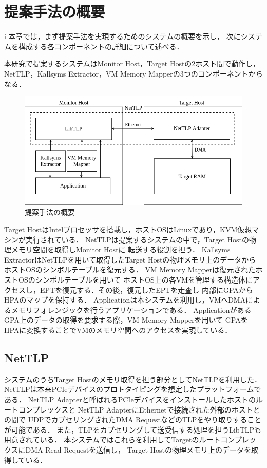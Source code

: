\chapter{提案手法の概要}
\label{chap:system_overview}

i
本章では，まず提案手法を実現するためのシステムの概要を示し，
次にシステムを構成する各コンポーネントの詳細について述べる．

本研究で提案するシステムはMonitor Host，Target Hostの2ホスト間で動作し，
NetTLP\cite{nettlp}，Kallsyms Extractor，VM Memory Mapperの3つのコンポーネントからなる．

\begin{figure}[h]
  \includegraphics[scale=0.305]{system_overview.png}
  \caption{提案手法の概要}
  \label{fig:sysytem_overview}
\end{figure}

Target HostはIntelプロセッサを搭載し，ホストOSはLinuxであり，KVM仮想マシンが実行されている．
NetTLPは提案するシステムの中で，Target Hostの物理メモリ空間を取得しMonitor Hostに
転送する役割を担う．
Kallsyms ExtractorはNetTLPを用いて取得したTarget Hostの物理メモリ上のデータから
ホストOSのシンボルテーブルを復元する．
VM Memory Mapperは復元されたホストOSのシンボルテーブルを用いて
ホストOS上の各VMを管理する構造体にアクセスし，EPTを復元する．その後，復元したEPTを走査し
内部にGPAからHPAのマップを保持する．
Applicationは本システムを利用し，VMへDMAによるメモリフォレンジックを行うアプリケーションである．
ApplicationがあるGPA上のデータの取得を要求する際，VM Memory Mapperを用いて
GPAをHPAに変換することでVMのメモリ空間へのアクセスを実現している．


\section{NetTLP}

システムのうちTarget Hostのメモリ取得を担う部分としてNetTLP\cite{nettlp}を利用した．
NetTLPは本来PCIeデバイスのプロトタイピングを想定したプラットフォームである．
NetTLP Adapterと呼ばれるPCIeデバイスをインストールしたホストのルートコンプレックスと
NetTLP AdapterにEthernetで接続された外部のホストとの間で
UDPでカプセリングされたDMA RequestなどのTLPをやり取りすることが可能である．
また，TLPをカプセリングして送受信する処理を担うLibTLPも用意されている．
本システムではこれらを利用してTargetのルートコンプレックスにDMA Read Requestを送信し，
Target Hostの物理メモリ上のデータを取得している．

